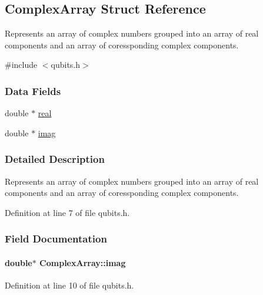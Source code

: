 \hypertarget{structComplexArray}{}\subsection{Complex\+Array Struct Reference}
\label{structComplexArray}


Represents an array of complex numbers grouped into an array of real components and an array of coressponding complex components.  




{\ttfamily \#include $<$qubits.\+h$>$}

\subsubsection*{Data Fields}
\begin{DoxyCompactItemize}
\item 
double $\ast$ \hyperlink{structComplexArray_a1cf9fd31d6dce5ef618d2bcf3e4f8b69}{real}
\item 
double $\ast$ \hyperlink{structComplexArray_aa409fd14e1ff3e1fdcc53cc4eb77a7a8}{imag}
\end{DoxyCompactItemize}


\subsubsection{Detailed Description}
Represents an array of complex numbers grouped into an array of real components and an array of coressponding complex components. 

Definition at line 7 of file qubits.\+h.



\subsubsection{Field Documentation}
\paragraph[{\texorpdfstring{imag}{imag}}]{\setlength{\rightskip}{0pt plus 5cm}double$\ast$ Complex\+Array\+::imag}\hypertarget{structComplexArray_aa409fd14e1ff3e1fdcc53cc4eb77a7a8}{}\label{structComplexArray_aa409fd14e1ff3e1fdcc53cc4eb77a7a8}


Definition at line 10 of file qubits.\+h.



